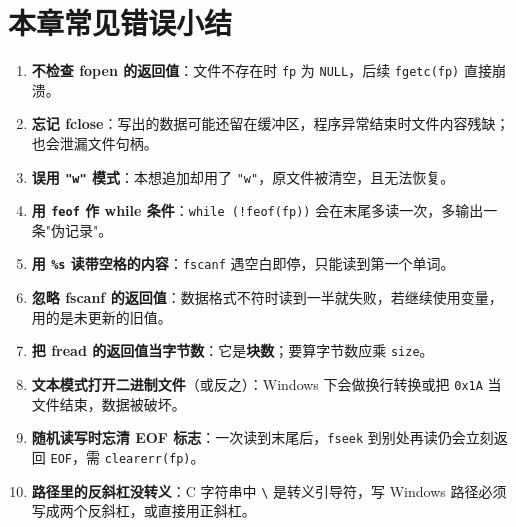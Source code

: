 \section{本章常见错误小结}
\begin{enumerate}
  \item \textbf{不检查 fopen 的返回值}：文件不存在时 \texttt{fp} 为 \texttt{NULL}，后续 \texttt{fgetc(fp)} 直接崩溃。
  \item \textbf{忘记 fclose}：写出的数据可能还留在缓冲区，程序异常结束时文件内容残缺；也会泄漏文件句柄。
  \item \textbf{误用 \texttt{"w"} 模式}：本想追加却用了 \texttt{"w"}，原文件被清空，且无法恢复。
  \item \textbf{用 \texttt{feof} 作 while 条件}：\texttt{while (!feof(fp))} 会在末尾多读一次，多输出一条"伪记录"。
  \item \textbf{用 \texttt{\%s} 读带空格的内容}：\texttt{fscanf} 遇空白即停，只能读到第一个单词。
  \item \textbf{忽略 fscanf 的返回值}：数据格式不符时读到一半就失败，若继续使用变量，用的是未更新的旧值。
  \item \textbf{把 fread 的返回值当字节数}：它是\textbf{块数}；要算字节数应乘 \texttt{size}。
  \item \textbf{文本模式打开二进制文件}（或反之）：Windows 下会做换行转换或把 \texttt{0x1A} 当文件结束，数据被破坏。
  \item \textbf{随机读写时忘清 EOF 标志}：一次读到末尾后，\texttt{fseek} 到别处再读仍会立刻返回 \texttt{EOF}，需 \texttt{clearerr(fp)}。
  \item \textbf{路径里的反斜杠没转义}：C 字符串中 \texttt{\textbackslash} 是转义引导符，写 Windows 路径必须写成两个反斜杠，或直接用正斜杠。
\end{enumerate}

